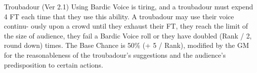 \begin{Chapter}{Troubadour (Ver 2.1)}
Using Bardic Voice is tiring, and a troubadour must expend 4 FT each
time that they use this ability.  A troubadour may use their voice
continu- ously upon a crowd until they exhaust their FT, they reach
the limit of the size of audience, they fail a Bardic Voice roll or
they have doubled (Rank / 2, round down) times.  The Base Chance is
50\% (+ 5 / Rank), modified by the GM for the reasonableness of the
troubadour’s suggestions and the audience’s predisposition to certain
actions.

\end{Chapter}

